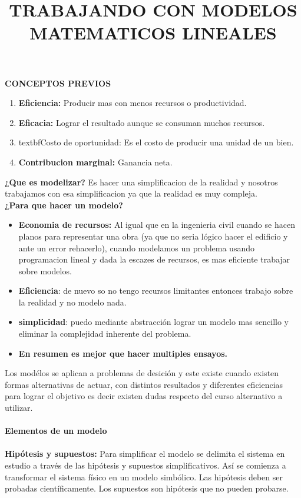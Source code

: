 \documentclass[12pt]{book}
\begin{document}
\textbf{CONCEPTOS PREVIOS}
\begin{enumerate}
	\item \textbf{Eficiencia:} Producir mas con menos recursos o productividad.
	\item \textbf{Eficacia:} Lograr el resultado aunque se consuman muchos recursos.
	\item textbf{Costo de oportunidad:} Es el costo de producir una unidad de un bien.
	\item \textbf{Contribucion marginal:} Ganancia neta.
\end{enumerate}
\title{\textbf{TRABAJANDO CON MODELOS MATEMATICOS LINEALES}}
\textbf{¿Que es modelizar?} Es hacer una simplificacion de la realidad y nosotros trabajamos con esa simplificacion ya que la realidad es muy compleja.
\\
\textbf{¿Para que hacer un modelo?}
\begin{itemize}
\item \textbf{Economia de recursos:} Al igual que en la ingenieria civil cuando se hacen planos para representar una obra (ya que no seria l\'ogico hacer el edificio y ante un error rehacerlo), cuando modelamos un problema usando programacion lineal y dada la escazes de recursos, es mas eficiente trabajar sobre modelos.
\item \textbf{Eficiencia}: de nuevo so no tengo recursos limitantes entonces trabajo sobre la realidad y no modelo nada.
\item \textbf{simplicidad}: puedo mediante abstracci\'on lograr un modelo mas sencillo y eliminar la complejidad inherente del problema.
\item \textbf{En resumen es mejor que hacer multiples ensayos.}
\end{itemize}
Los mod\'elos se aplican a problemas de desici\'on y este existe cuando existen formas alternativas de actuar, con distintos resultados y diferentes eficiencias para lograr el objetivo es decir existen dudas respecto del curso alternativo a utilizar.
\\
\\
\textbf{Elementos de un modelo}
\\
\\
\textbf{Hipótesis y supuestos:} Para simplificar el modelo se delimita el sistema en estudio a través de las hipótesis y
supuestos simplificativos. Así se comienza a transformar el sistema físico en un modelo simbólico.
Las hipótesis deben ser probadas científicamente. Los supuestos son hipótesis que no pueden probarse.
\\
\end{document}
